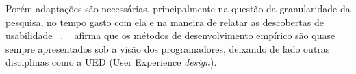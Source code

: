 	Porém adaptações são necessárias, principalmente na questão da granularidade da pesquisa, no tempo gasto com ela e na maneira de relatar as descobertas de usabilidade ~\cite{santos2012}.
	~ afirma que os métodos de desenvolvimento empírico são quase sempre apresentados sob a visão dos programadores, deixando de lado outras disciplinas como a UED (User Experience \emph{design}). 

